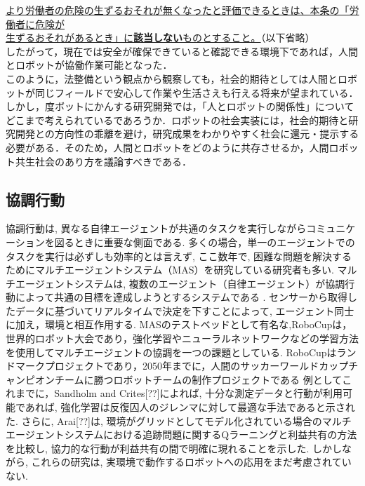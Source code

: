  \underline{より労働者の危険の生ずるおそれが無くなったと評価できるときは、本条の「労働者に危険が}\\
 \underline{生ずるおそれがあるとき」に{\bf 該当しない}ものとすること。}（以下省略）\\
したがって，現在では安全が確保できていると確認できる環境下であれば，人間とロボットが協働作業可能となった．\\
このように，法整備という観点から観察しても，社会的期待としては人間とロボットが同じフィールドで安心して作業や生活さえも行える将来が望まれている．しかし，度ボットにかんする研究開発では，「人とロボットの関係性」についてどこまで考えられているであろうか．ロボットの社会実装には，社会的期待と研究開発との方向性の乖離を避け，研究成果をわかりやすく社会に還元・提示する必要がある．そのため，人間とロボットをどのように共存させるか，人間ロボット共生社会のあり方を議論すべきである．
\subsection{協調行動}
協調行動は, 異なる自律エージェントが共通のタスクを実行しながらコミュニケーションを図るときに重要な側面である. 多くの場合，単一のエージェントでのタスクを実行は必ずしも効率的とは言えず, ここ数年で, 困難な問題を解決するためにマルチエージェントシステム（MAS）を研究している研究者も多い. マルチエージェントシステムは, 複数のエージェント（自律エージェント）が協調行動によって共通の目標を達成しようとするシステムである .  センサーから取得したデータに基づいてリアルタイムで決定を下すことによって, エージェント同士に加え，環境と相互作用する. %
MASのテストベッドとして有名な,RoboCupは，世界的ロボット大会であり，強化学習やニューラルネットワークなどの学習方法を使用してマルチエージェントの協調を一つの課題としている.  RoboCupはランドマークプロジェクトであり，2050年までに，人間のサッカーワールドカップチャンピオンチームに勝つロボットチームの制作プロジェクトである%
例としてこれまでに，Sandholm and Crites[??]によれば, 十分な測定データと行動が利用可能であれば, 強化学習は反復囚人のジレンマに対して最適な手法であると示された. さらに, Arai[??]は, 環境がグリッドとしてモデル化されている場合のマルチエージェントシステムにおける追跡問題に関するQラーニングと利益共有の方法を比較し, 協力的な行動が利益共有の間で明確に現れることを示した. しかしながら, これらの研究は, 実環境で動作するロボットへの応用をまだ考慮されていない. 

